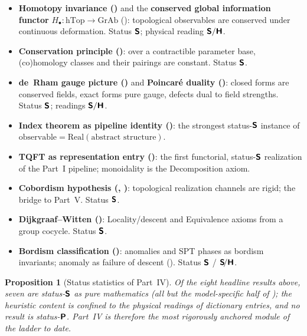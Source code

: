 \documentclass[12pt]{article}
\newtheorem{proposition}[proposition]{Proposition}
\theoremstyle{definition}
\theoremstyle{remark}
\newcommand{\hTop}{\mathrm{hTop}}
\newcommand{\GrAb}{\mathrm{GrAb}}
\newcommand{\Real}{\mathrm{Real}}
\newcommand{\Sfont}{\textnormal{\sffamily\bfseries S}}
\newcommand{\Hfont}{\textnormal{\sffamily\bfseries H}}
\newcommand{\Pfont}{\textnormal{\sffamily\bfseries P}}
\begin{document}
\begin{itemize}
  \item \textbf{Homotopy invariance ()} and the
    \textbf{conserved global information functor} $H_\bullet\colon\hTop\to\GrAb$
    (): topological observables are conserved under continuous
    deformation. Status $\Sfont$; physical reading $\Sfont/\Hfont$.
  \item \textbf{Conservation principle ()}: over a
    contractible parameter base, (co)homology classes and their pairings are
    constant. Status $\Sfont$.
  \item \textbf{de~Rham gauge picture ()} and
    \textbf{Poincar\'e duality ()}: closed forms are conserved
    fields, exact forms pure gauge, defects dual to field strengths. Status
    $\Sfont$; readings $\Sfont/\Hfont$.
  \item \textbf{Index theorem as pipeline identity ()}: the
    strongest status-$\Sfont$ instance of $\text{observable}=\Real(\text{abstract
    structure})$.
  \item \textbf{TQFT as representation entry ()}: the first
    functorial, status-$\Sfont$ realization of the Part~I pipeline; monoidality is
    the Decomposition axiom.
  \item \textbf{Cobordism hypothesis (, )}:
    topological realization channels are rigid; the bridge to Part~V. Status
    $\Sfont$.
  \item \textbf{Dijkgraaf--Witten ()}: Locality/descent and
    Equivalence axioms from a group cocycle. Status $\Sfont$.
  \item \textbf{Bordism classification ()}: anomalies and SPT phases
    as bordism invariants; anomaly as failure of descent ().
    Status $\Sfont$ / $\Sfont\!/\Hfont$.
\end{itemize}

\begin{proposition}[Status statistics of Part~IV]
\label{prop:status-stats}
Of the eight headline results above, seven are status-$\Sfont$ as pure
mathematics (all but the model-specific half of ); the heuristic
content is confined to the \emph{physical readings} of dictionary entries, and no
result is status-$\Pfont$. Part~IV is therefore the most rigorously anchored
module of the ladder to date.
\end{proposition}
\end{document}
